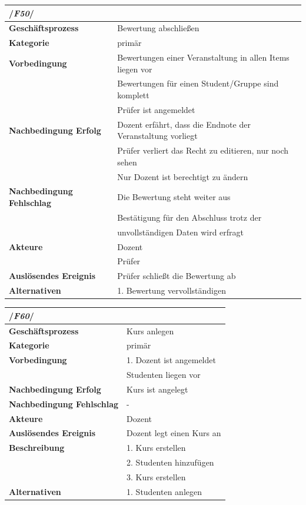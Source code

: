 \begin{table}[ht]
	\begin{tabular}{ll}
		\multicolumn{2}{l}{/\textbf{\textit{F50}}/}\\\hline
		 \textbf{Geschäftsprozess} & Bewertung abschließen\\ 
		 \textbf{Kategorie} & primär \\ 
		 \textbf{Vorbedingung} & Bewertungen einer Veranstaltung in allen Items liegen vor\\
		 & Bewertungen für einen Student/Gruppe sind komplett\\
		 & Prüfer ist angemeldet \\ 
		 \textbf{Nachbedingung Erfolg} & Dozent erfährt, dass die Endnote der Veranstaltung vorliegt  \\ 
		 & Prüfer verliert das Recht zu editieren, nur noch sehen\\
		 & Nur Dozent ist berechtigt zu ändern\\
		 \textbf{Nachbedingung Fehlschlag} &  Die Bewertung steht weiter aus\\
		 & Bestätigung für den Abschluss trotz der \\
		 & unvollständigen Daten wird erfragt\\ 
		 \textbf{Akteure} & Dozent \\ 
		 & Prüfer\\
		 \textbf{Auslösendes Ereignis} & Prüfer schließt die Bewertung ab \\ 
		 \textbf{Alternativen} & 1. Bewertung vervollständigen \\
		 \end{tabular} 
	\label{tab:F50}
	\end{table}		
			
	\begin{table}[ht]
		\begin{tabular}{ll}
			\multicolumn{2}{l}{/\textbf{\textit{F60}}/}\\\hline
			 \textbf{Geschäftsprozess} & Kurs anlegen\\ 
			 \textbf{Kategorie} & primär \\ 
			 \textbf{Vorbedingung} & 1. Dozent ist angemeldet \phantom{aaaaaaaaaaaaaaaaaaaaaaaaaaaaaaa} \\
			  & Studenten liegen vor\\
			 \textbf{Nachbedingung Erfolg} & Kurs ist angelegt\\
			 \textbf{Nachbedingung Fehlschlag} & -\\
			 \textbf{Akteure} & Dozent \\ 
			 \textbf{Auslösendes Ereignis} & Dozent legt einen Kurs an\\ 
			 \textbf{Beschreibung} &  1. Kurs erstellen\\
			 & 2. Studenten hinzufügen\\
			 & 3. Kurs erstellen\\
			 \textbf{Alternativen} & 1. Studenten anlegen \\
			 \end{tabular} 
		\label{tab:F60}
		\end{table}
		
